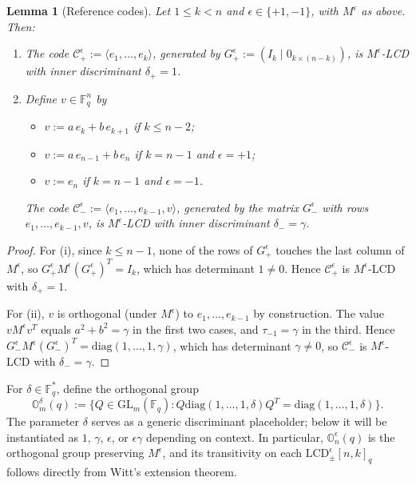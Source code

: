 \documentclass[11pt]{article}
\newcommand{\FF}{\mathbb{F}}
\newcommand{\0}{\mathbf{0}}
\newcommand{\1}{\mathbf{1}}
\theoremstyle{plain}
\newtheorem{lemma}[theorem]{Lemma}
\theoremstyle{definition}
\theoremstyle{remark}
\begin{document}
\begin{lemma}[Reference codes]\label{lem:reference_codes}
Let $1 \leq k < n$ and $\epsilon \in \{+1, -1\}$, with $M^\epsilon$ as above. Then:
\begin{enumerate}
\item[(i)] The code $\mathcal{C}_+^\epsilon := \langle e_1, \ldots, e_k\rangle$, generated by $G_+^\epsilon := (I_k \mid 0_{k \times (n-k)})$, is $M^\epsilon$-LCD with inner discriminant $\delta_+ = 1$.
\item[(ii)] Define $v \in \FF_q^n$ by
\begin{itemize}
\item $v := a\, e_k + b\, e_{k+1}$ if $k \leq n-2$;
\item $v := a\, e_{n-1} + b\, e_n$ if $k = n-1$ and $\epsilon = +1$;
\item $v := e_n$ if $k = n-1$ and $\epsilon = -1$.
\end{itemize}
The code $\mathcal{C}_-^\epsilon := \langle e_1, \ldots, e_{k-1}, v\rangle$, generated by the matrix $G_-^\epsilon$ with rows $e_1, \ldots, e_{k-1}, v$, is $M^\epsilon$-LCD with inner discriminant $\delta_- = \gamma$.
\end{enumerate}
\end{lemma}
\begin{proof}
For (i), since $k \leq n-1$, none of the rows of $G_+^\epsilon$ touches the last column of $M^\epsilon$, so $G_+^\epsilon M^\epsilon (G_+^\epsilon)^T = I_k$, which has determinant $1 \neq 0$. Hence $\mathcal{C}_+^\epsilon$ is $M^\epsilon$-LCD with $\delta_+ = 1$.

For (ii), $v$ is orthogonal (under $M^\epsilon$) to $e_1, \ldots, e_{k-1}$ by construction. The value $v M^\epsilon v^T$ equals $a^2 + b^2 = \gamma$ in the first two cases, and $\tau_{-1} = \gamma$ in the third. Hence $G_-^\epsilon M^\epsilon (G_-^\epsilon)^T = \mathrm{diag}(1, \ldots, 1, \gamma)$, which has determinant $\gamma \neq 0$, so $\mathcal{C}_-^\epsilon$ is $M^\epsilon$-LCD with $\delta_- = \gamma$.
\end{proof}

For $\delta \in \FF_q^*$, define the orthogonal group
\[
\mathbb{O}_m^\delta(q) := \{Q \in \mathrm{GL}_m(\FF_q) : Q \mathrm{diag}(1, \ldots, 1, \delta) Q^T = \mathrm{diag}(1, \ldots, 1, \delta)\}.
\]
The parameter $\delta$ serves as a generic discriminant placeholder; below it will be instantiated as $1$, $\gamma$, $\epsilon$, or $\epsilon\gamma$ depending on context. In particular, $\mathbb{O}_n^\epsilon(q)$ is the orthogonal group preserving $M^\epsilon$, and its transitivity on each $\mathrm{LCD}^\epsilon_\pm[n, k]_q$ follows directly from Witt's extension theorem.
\end{document}
